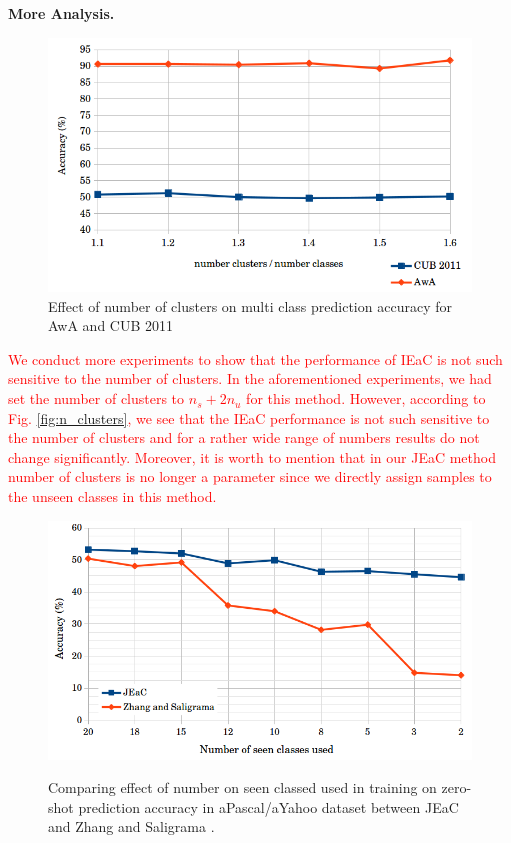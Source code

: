 \documentclass[10pt,twocolumn,letterpaper]{article}
\begin{document}
\textbf{More Analysis.}
\begin{figure}[t]
  \centering
  \includegraphics[width=\linewidth]{num_clusters}
  \caption{ Effect of number of clusters on multi class prediction accuracy for
  AwA and CUB 2011}
  \label{fig:n_culsters}
\end{figure}
\textcolor{red}{
We conduct more experiments to show that the performance of IEaC is not such sensitive to the number of clusters.
 In the aforementioned experiments, we had set the number of clusters to $n_s+2n_u$ for this method.
  However, according to Fig. \ref{fig:n_clusters}, we see that the IEaC performance is not such sensitive to the number of clusters and for a rather wide range of
   numbers results do not change significantly.
    Moreover, it is worth to mention that in our JEaC method number of clusters is no longer a parameter
     since we directly assign samples to the unseen classes in this method.
}
\begin{figure}[t]
  \centering
    \includegraphics[width=\linewidth]{num_seen}
    \label{fig:n_seen}
    \caption{Comparing effect of number on seen classed used in training on zero-shot prediction accuracy
      in aPascal/aYahoo dataset between JEaC and Zhang and Saligrama \cite{agnostic}.
     }
\end{figure}
\end{document}
